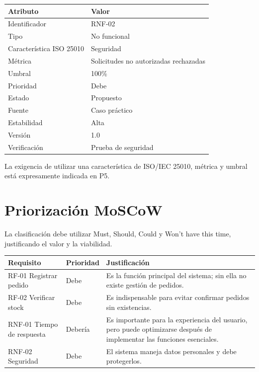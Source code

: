 \documentclass[12pt,a4paper]{article}
\begin{document}
\begin{center}
\begin{tabular}{ll}
\toprule
\textbf{Atributo} & \textbf{Valor} \\
\midrule
Identificador & RNF-02 \\
Tipo & No funcional \\
Característica ISO 25010 & Seguridad \\
Métrica & Solicitudes no autorizadas rechazadas \\
Umbral & 100\% \\
Prioridad & Debe \\
Estado & Propuesto \\
Fuente & Caso práctico \\
Estabilidad & Alta \\
Versión & 1.0 \\
Verificación & Prueba de seguridad \\
\bottomrule
\end{tabular}
\end{center}

La exigencia de utilizar una característica de ISO/IEC 25010, métrica y umbral está expresamente indicada en P5.

\section{Priorización MoSCoW}

La clasificación debe utilizar Must, Should, Could y Won't have this time, justificando el valor y la viabilidad.

\begin{center}
\small
\begin{tabular}{p{3.2cm}lp{7.5cm}}
\toprule
\textbf{Requisito} & \textbf{Prioridad} & \textbf{Justificación} \\
\midrule
RF-01 Registrar pedido & Debe & Es la función principal del sistema; sin ella no existe gestión de pedidos. \\
RF-02 Verificar stock & Debe & Es indispensable para evitar confirmar pedidos sin existencias. \\
RNF-01 Tiempo de respuesta & Debería & Es importante para la experiencia del usuario, pero puede optimizarse después de implementar las funciones esenciales. \\
RNF-02 Seguridad & Debe & El sistema maneja datos personales y debe protegerlos. \\
\bottomrule
\end{tabular}
\end{center}
\end{document}
